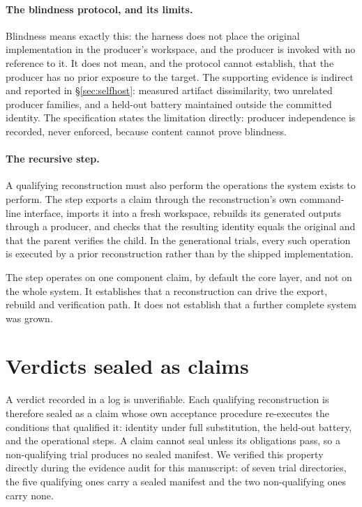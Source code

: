 \paragraph{The blindness protocol, and its limits.} Blindness means
exactly this: the harness does not place the original implementation in
the producer's workspace, and the producer is invoked with no reference
to it. It does not mean, and the protocol cannot establish, that the
producer has no prior exposure to the target. The supporting evidence is
indirect and reported in \S\ref{sec:selfhost}: measured artifact
dissimilarity, two unrelated producer families, and a held-out battery
maintained outside the committed identity. The specification states the
limitation directly: producer independence is recorded, never enforced,
because content cannot prove blindness.

\paragraph{The recursive step.} A qualifying reconstruction must also
perform the operations the system exists to perform. The step exports a
claim through the reconstruction's own command-line interface, imports it
into a fresh workspace, rebuilds its generated outputs through a
producer, and checks that the resulting identity equals the original and
that the parent verifies the child. In the generational trials, every
such operation is executed by a prior reconstruction rather than by the
shipped implementation.

The step operates on one component claim, by default the core layer, and
not on the whole system. It establishes that a reconstruction can drive
the export, rebuild and verification path. It does not establish that a
further complete system was grown.

\section{Verdicts sealed as claims}
\label{app:trialclaims}

A verdict recorded in a log is unverifiable. Each qualifying
reconstruction is therefore sealed as a claim whose own acceptance
procedure re-executes the conditions that qualified it: identity under
full substitution, the held-out battery, and the operational steps. A
claim cannot seal unless its obligations pass, so a non-qualifying trial
produces no sealed manifest. We verified this property directly during
the evidence audit for this manuscript: of seven trial directories, the
five qualifying ones carry a sealed manifest and the two non-qualifying
ones carry none.

